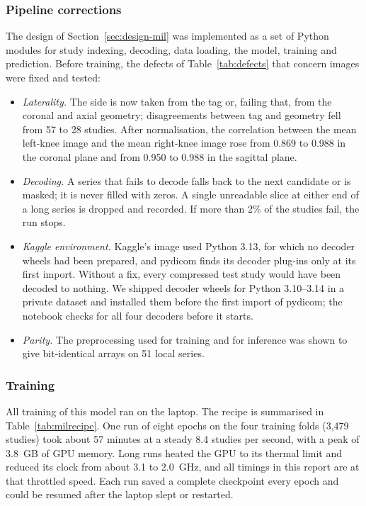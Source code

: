 \subsubsection{Pipeline corrections} The design of Section~\ref{sec:design-mil} was implemented as a set of Python modules for study indexing, decoding, data loading, the model, training and prediction. Before training, the defects of Table~\ref{tab:defects} that concern images were fixed and tested:
\begin{itemize}[leftmargin=1.4em]
\item \emph{Laterality.} The side is now taken from the tag or, failing that, from the coronal and axial geometry; disagreements between tag and geometry fell from 57 to 28 studies. After normalisation, the correlation between the mean left-knee image and the mean right-knee image rose from 0.869 to 0.988 in the coronal plane and from 0.950 to 0.988 in the sagittal plane.
\item \emph{Decoding.} A series that fails to decode falls back to the next candidate or is masked; it is never filled with zeros. A single unreadable slice at either end of a long series is dropped and recorded. If more than 2\% of the studies fail, the run stops.
\item \emph{Kaggle environment.} Kaggle's image used Python 3.13, for which no decoder wheels had been prepared, and pydicom finds its decoder plug-ins only at its first import. Without a fix, every compressed test study would have been decoded to nothing. We shipped decoder wheels for Python 3.10--3.14 in a private dataset and installed them before the first import of pydicom; the notebook checks for all four decoders before it starts.
\item \emph{Parity.} The preprocessing used for training and for inference was shown to give bit-identical arrays on 51 local series.
\end{itemize}

\subsubsection{Training} All training of this model ran on the laptop. The recipe is summarised in Table~\ref{tab:milrecipe}. One run of eight epochs on the four training folds (3,479 studies) took about 57 minutes at a steady 8.4 studies per second, with a peak of 3.8~GB of GPU memory. Long runs heated the GPU to its thermal limit and reduced its clock from about 3.1 to 2.0~GHz, and all timings in this report are at that throttled speed. Each run saved a complete checkpoint every epoch and could be resumed after the laptop slept or restarted.

